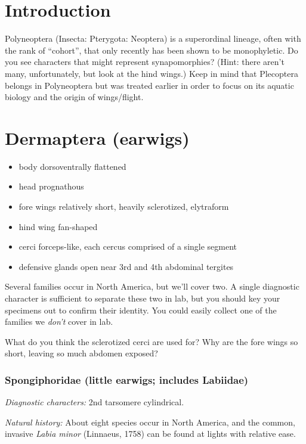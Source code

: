 \section*{Introduction}
Polyneoptera (Insecta: Pterygota: Neoptera) is a superordinal lineage, often with the rank of ``cohort'', that only recently has been shown to be monophyletic. Do you see characters that might represent synapomorphies? (Hint: there aren't many, unfortunately, but look at the hind wings.) Keep in mind that Plecoptera belongs in Polyneoptera but was treated earlier in order to focus on its aquatic biology and the origin of wings/flight.

\section{Dermaptera (earwigs)}
\begin{itemize}
\item body dorsoventrally flattened
\item head prognathous
\item fore wings relatively short, heavily sclerotized, elytraform
\item hind wing fan-shaped
\item cerci forceps-like, each cercus comprised of a single segment
\item defensive glands open near 3rd and 4th abdominal tergites
\end{itemize}
Several families occur in North America, but we'll cover two. A single diagnostic character is sufficient to separate these two in lab, but you should key \citep{engelDerm} your specimens out to confirm their identity. You could easily collect one of the families we \textit{don't} cover in lab.\vspace{3mm}

\begin{theo}
{}What do you think the sclerotized cerci are used for? Why are the fore wings so short, leaving so much abdomen exposed?
\end{theo} 

\subsubsection{Spongiphoridae (little earwigs; includes Labiidae)}
\noindent{}\textit{Diagnostic characters:} 2nd tarsomere cylindrical.\vspace{3mm}

\noindent{}\textit{Natural history:} About eight species occur in North America, and the common, invasive \textit{Labia minor} (Linnaeus, 1758) can be found at lights with relative ease.\vspace{3mm}

